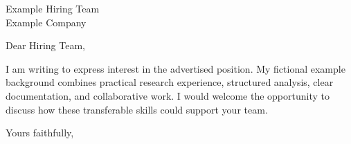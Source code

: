 \documentclass[11pt,a4paper]{letter}
\begin{document}
\begin{letter}{Example Hiring Team\\Example Company}
\opening{Dear Hiring Team,}
I am writing to express interest in the advertised position. My fictional example background combines practical research experience, structured analysis, clear documentation, and collaborative work. I would welcome the opportunity to discuss how these transferable skills could support your team.
\closing{Yours faithfully,}
\end{letter}
\end{document}
